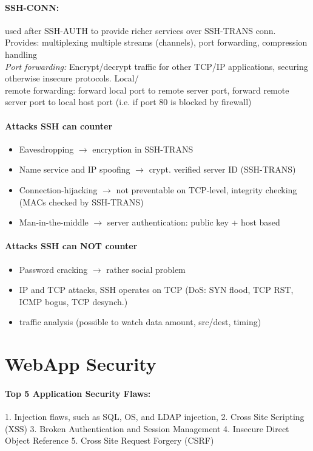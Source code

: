 \paragraph{SSH-CONN:} used after SSH-AUTH to provide richer services over SSH-TRANS conn. Provides: multiplexing multiple streams (channels), port forwarding, compression handling\\
\emph{Port forwarding:} Encrypt/decrypt traffic for other TCP/IP applications, securing otherwise insecure protocols. Local/\\remote forwarding: forward local port to remote server port, forward remote server port to local host port (i.e. if port 80 is blocked by firewall)

\paragraph{Attacks SSH can counter}
\begin{itemize}
\item Eavesdropping $\to$ encryption in SSH-TRANS
\item Name service and IP spoofing $\to$ crypt. verified server ID (SSH-TRANS) 
\item Connection-hijacking $\to$ not preventable on TCP-level, integrity checking (MACs checked by SSH-TRANS)
\item Man-in-the-middle $\to$ server authentication: public key + host based
\end{itemize}

\paragraph{Attacks SSH can NOT counter}
\begin{itemize}
\item Password cracking $\to$ rather social problem
\item IP and TCP attacks, SSH operates on TCP (DoS: SYN flood, TCP RST, ICMP bogus, TCP desynch.)
\item traffic analysis (possible to watch data amount, src/dest, timing)
\end{itemize}

\section{WebApp Security}
\paragraph{Top 5 Application Security Flaws:} 1. Injection flaws, such as SQL, OS, and LDAP injection, 2. Cross Site Scripting (XSS)
3. Broken Authentication and Session Management
4. Insecure Direct Object Reference
5. Cross Site Request Forgery (CSRF)


